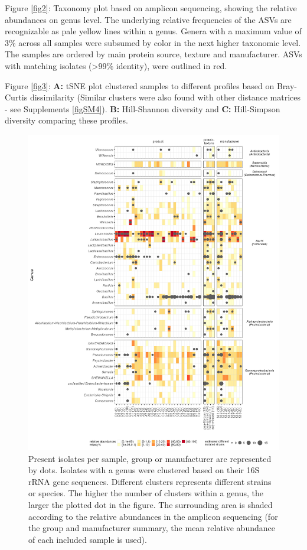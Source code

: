 \documentclass[preprint,3p,
a4paper]{elsarticle} %
\begin{document}
Figure \ref{fig2}: Taxonomy plot based on amplicon sequencing, showing
the relative abundances on genus level. The underlying relative
frequencies of the ASVs are recognizable as pale yellow lines within a
genus. Genera with a maximum value of 3\% across all samples were
subsumed by color in the next higher taxonomic level. The samples are
ordered by main protein source, texture and manufacturer. ASVs with
matching isolates (\textgreater99\% identity), were outlined in red.

Figure \ref{fig3}: \textbf{A:} tSNE plot clustered samples to different
profiles based on Bray-Curtis dissimilarity (Similar clusters were also
found with other distance matrices - see Supplements \ref{figSM4}).
\textbf{B:} Hill-Shannon diversity and \textbf{C:} Hill-Simpson
diversity comparing these profiles.

\begin{figure}

{\centering \includegraphics[width=1\linewidth]{Fig1inclmeanrelab} 

}

\caption{\label{fig1} Present isolates per sample, group or manufacturer are represented by dots. Isolates with a genus were clustered based on their 16S rRNA gene sequences. Different clusters represents different strains or species. The higher the number of clusters within a genus, the larger the plotted dot in the figure. The surrounding area is shaded according to the relative abundances in the amplicon sequencing (for the group and manufacturer summary, the mean relative abundance of each included sample is used).}\label{fig:fig1}
\end{figure}
\end{document}
